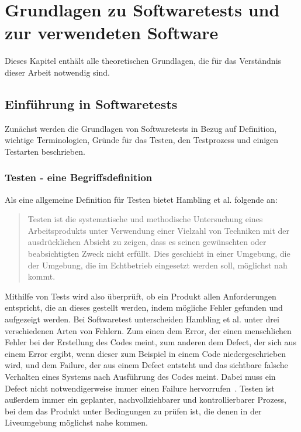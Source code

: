 \chapter{Grundlagen zu Softwaretests und zur verwendeten Software}
\nocite{*}
Dieses Kapitel enthält alle theoretischen Grundlagen, die für das Verständnis dieser Arbeit notwendig sind.
\section{Einführung in Softwaretests}
Zunächst werden die Grundlagen von Softwaretests in Bezug auf Definition, wichtige Terminologien, Gründe für das Testen, den Testprozess und einigen Testarten beschrieben.
\subsection{Testen - eine Begriffsdefinition}
Als eine allgemeine Definition für Testen bietet Hambling et al. folgende an: \begin{quote}Testen ist die systematische und methodische Untersuchung eines Arbeitsprodukts unter Verwendung einer Vielzahl von Techniken mit der ausdr{\"u}cklichen Absicht zu zeigen, dass es seinen gew{\"u}nschten oder beabsichtigten Zweck nicht erf{\"u}llt. Dies geschieht in einer Umgebung, die der Umgebung, die im Echtbetrieb eingesetzt werden soll, m{\"o}glichst nah kommt.~\cite[section WHAT TESTING IS AND WHAT TESTING DOES paragraph 2]{Hambling.2019}\end{quote}
Mithilfe von Tests wird also überprüft, ob ein Produkt allen Anforderungen entspricht, die an dieses gestellt werden, indem mögliche Fehler gefunden und aufgezeigt werden. Bei Softwaretest unterscheiden Hambling et al. unter drei verschiedenen Arten von  Fehlern. Zum einen dem Error, der einen menschlichen Fehler bei der Erstellung des Codes meint, zum anderen dem Defect, der sich aus einem Error ergibt, wenn dieser zum Beispiel in einem Code niedergeschrieben wird, und dem Failure, der aus einem Defect entsteht und das sichtbare falsche Verhalten eines Systems nach Ausführung des Codes meint. Dabei muss ein Defect nicht notwendigerweise immer einen Failure hervorrufen~\cite{Hambling.2019}. 
Testen ist außerdem immer ein geplanter, nachvollziehbarer und kontrollierbarer Prozess, bei dem das Produkt unter Bedingungen zu prüfen ist, die denen in der Liveumgebung möglichst nahe kommen. 

